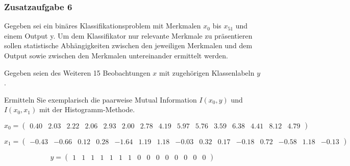 \documentclass[11pt]{article}
\begin{document}
    \subsubsection{Zusatzaufgabe 6}\label{zusatzaufgabe-6}

Gegeben sei ein binäres Klassifikationsproblem mit Merkmalen \(x_{0}\)
bis \(x_{51}\) und einem Output y. Um dem Klassifikator nur relevante
Merkmale zu präsentieren sollen statistische Abhängigkeiten zwischen den
jeweiligen Merkmalen und dem Output sowie zwischen den Merkmalen
untereinander ermittelt werden.

Gegeben seien des Weiteren 15 Beobachtungen \(x\) mit zugehörigen
Klassenlabeln \(y\).

Ermitteln Sie exemplarisch die paarweise Mutual Information
\(I(x_0, y)\) und \(I(x_0, x_1)\) mit der Histogramm-Methode.

\[x_0 = \left(\begin{array}{rrrrrrrrrrrrrrrrrrrr}%
0.40 & 2.03 & 2.22 & 2.06 & 2.93 & 2.00 & 2.78 & 4.19 & 5.97 & 5.76 & 3.59 & 6.38 & 4.41 & 8.12 & 4.79%
\end{array}\right)%
\]

\[x_1 = \left(\begin{array}{rrrrrrrrrrrrrrrrrrrr}%
-0.43 & -0.66 & 0.12 & 0.28 & -1.64 & 1.19 & 1.18 & -0.03 & 0.32 & 0.17 & -0.18 & 0.72 & -0.58 & 1.18 & -0.13%
\end{array}\right)%
\]

\[y = \left(\begin{array}{rrrrrrrrrrrrrrrrrrrr}%
1 & 1 & 1 & 1 & 1 & 1 & 1 & 0 & 0 & 0 & 0 & 0 & 0 & 0 & 0%
\end{array}\right)%
\]
\end{document}
